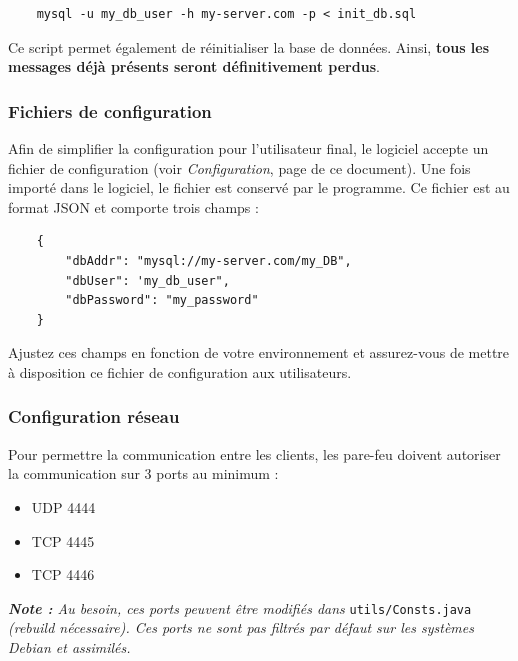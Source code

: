\documentclass[12pt, a4paper]{article}
\begin{document}
    \begin{verbatim}
    mysql -u my_db_user -h my-server.com -p < init_db.sql
    \end{verbatim}
    \vspace{-10pt}
    
    Ce script permet également de réinitialiser la base de données. Ainsi, \textbf{tous les messages déjà présents seront définitivement perdus}.
    
    
    \subsubsection{Fichiers de configuration}
    Afin de simplifier la configuration pour l'utilisateur final, le logiciel accepte un fichier de configuration (voir \textit{Configuration}, page \pageref{config} de ce document). Une fois importé dans le logiciel, le fichier est conservé par le programme. Ce fichier est au format JSON et comporte trois champs :
    
    \begin{verbatim}
    {
        "dbAddr": "mysql://my-server.com/my_DB",
        "dbUser": 'my_db_user",
        "dbPassword": "my_password"
    }
    \end{verbatim}
    \vspace{-10pt}
    
    Ajustez ces champs en fonction de votre environnement et assurez-vous de mettre à disposition ce fichier de configuration aux utilisateurs.
    
    \subsubsection{Configuration réseau}
    Pour permettre la communication entre les clients, les pare-feu doivent autoriser la communication sur 3 ports au minimum :
    
    \begin{itemize}
        \item UDP 4444
        \item TCP 4445
        \item TCP 4446
    \end{itemize}
    
    \textit{\textbf{Note :} Au besoin, ces ports peuvent être modifiés dans }\texttt{utils/Consts.java}\textit{ (rebuild nécessaire). Ces ports ne sont pas filtrés par défaut sur les systèmes Debian et assimilés.}\\
    
\end{document}
